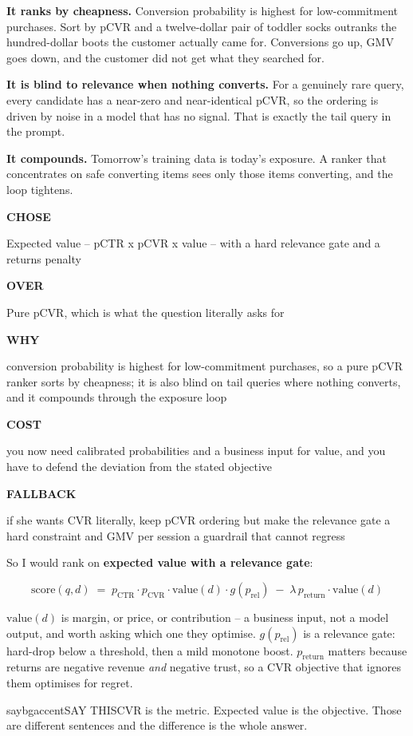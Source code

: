 \documentclass[10pt,twoside]{book}
\makeatletter
\newenvironment{calloutsay}{\begin{co@box}{saybg}{accent}{SAY THIS}}{\end{co@box}}
\newenvironment{mathbox}{\begin{mathboxtc}}{\end{mathboxtc}}
\newenvironment{decide}[1]{%
  \par\smallskip\noindent
  \begin{tcolorbox}[colback=white,colframe=accent,boxrule=1pt,arc=3pt,
    left=8pt,right=8pt,top=6pt,bottom=5pt,
    title={\sffamily\bfseries\small #1},coltitle=white,colbacktitle=accent,
    fonttitle=\sffamily]%
  \small%
}{\end{tcolorbox}\par\smallskip}
\newcommand{\drow}[2]{%
  \par\noindent
  \begin{minipage}[t]{58pt}\raggedright\strut
    {\sffamily\bfseries\scriptsize\color{accent}#1}\end{minipage}%
  \hspace{6pt}%
  \begin{minipage}[t]{\dimexpr\linewidth-64pt\relax}\strut #2\end{minipage}%
  \par\vspace{3.5pt}}
\makeatother
\begin{document}
\textbf{It ranks by cheapness.} Conversion probability is highest for low-commitment purchases. Sort by pCVR and a twelve-dollar pair of toddler socks outranks the hundred-dollar boots the customer actually came for. Conversions go up, GMV goes down, and the customer did not get what they searched for.\par
\textbf{It is blind to relevance when nothing converts.} For a genuinely rare query, every candidate has a near-zero and near-identical pCVR, so the ordering is driven by noise in a model that has no signal. That is exactly the tail query in the prompt.\par
\textbf{It compounds.} Tomorrow's training data is today's exposure. A ranker that concentrates on safe converting items sees only those items converting, and the loop tightens.\par
\begin{decide}{What does the ranker actually optimise?}
\drow{CHOSE}{Expected value -- pCTR x pCVR x value -- with a hard relevance gate and a returns penalty}
\drow{OVER}{Pure pCVR, which is what the question literally asks for}
\drow{WHY}{conversion probability is highest for low-commitment purchases, so a pure pCVR ranker sorts by cheapness; it is also blind on tail queries where nothing converts, and it compounds through the exposure loop}
\drow{COST}{you now need calibrated probabilities and a business input for value, and you have to defend the deviation from the stated objective}
\drow{FALLBACK}{if she wants CVR literally, keep pCVR ordering but make the relevance gate a hard constraint and GMV per session a guardrail that cannot regress}
\end{decide}
So I would rank on \textbf{expected value with a relevance gate}:\par
\begin{mathbox}\[\mathrm{score}(q,d) \;=\;
p_{\mathrm{CTR}}\cdot p_{\mathrm{CVR}}\cdot \mathrm{value}(d)\cdot g(p_{\mathrm{rel}})
\;-\; \lambda\, p_{\mathrm{return}}\cdot \mathrm{value}(d)\]\end{mathbox}
$\mathrm{value}(d)$ is margin, or price, or contribution -- a business input, not a model output, and worth asking which one they optimise. $g(p_{\mathrm{rel}})$ is a relevance gate: hard-drop below a threshold, then a mild monotone boost. $p_{\mathrm{return}}$ matters because returns are negative revenue \textit{and} negative trust, so a CVR objective that ignores them optimises for regret.\par
\begin{calloutsay}CVR is the metric. Expected value is the objective. Those are different sentences and the difference is the whole answer.\end{calloutsay}
\end{document}
